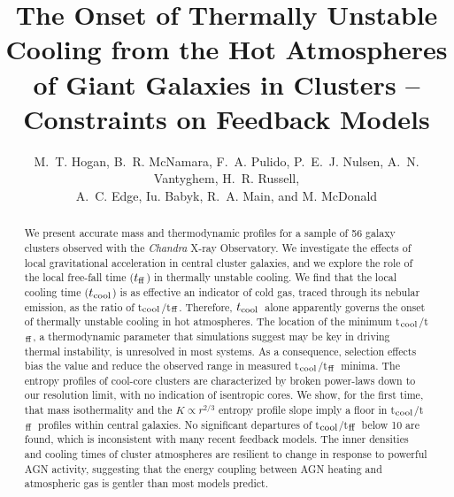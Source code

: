 \documentclass[twocolumn]{aastex6}
\newcommand{\tctff}{{t$_{\rm cool}$/t$_{\rm ff}$}}
\newcommand{\tc}{$t_{\rm cool}$}
\newcommand{\tff}{$t_{\rm ff}$}
\begin{document}
\title{The Onset of Thermally Unstable Cooling from the Hot Atmospheres of Giant Galaxies in Clusters -- Constraints on Feedback Models}

\author{M.~T. Hogan, B.~R. McNamara, F.~A. Pulido, P.~E.~J. Nulsen, A.~N. Vantyghem, H.~R. Russell, \\ A.~C. Edge, Iu. Babyk, R.~A. Main, and M. McDonald}



\begin{abstract}
We present accurate mass and thermodynamic profiles for a sample of 56 galaxy clusters observed with the {\it Chandra} X-ray Observatory. We investigate the effects of local gravitational acceleration in central cluster galaxies, and we explore the role of the local free-fall time (\tff) in thermally unstable cooling.  We find that the local cooling time (\tc) is as effective an indicator of cold gas, traced through its nebular emission, as the ratio of \tctff.   Therefore, \tc\ alone apparently governs the onset of thermally unstable cooling in hot atmospheres.  The location of the minimum \tctff, a thermodynamic parameter that simulations suggest may be key in driving thermal instability, is unresolved in most systems.  As a consequence, selection effects bias the value and reduce the observed range in measured \tctff\ minima. The entropy profiles of cool-core clusters are characterized by broken power-laws down to our resolution limit, with no indication of isentropic cores.  We show, for the first time, that mass isothermality and the $K \propto r^{2/3}$ entropy profile slope imply a floor in \tctff\ profiles within central galaxies.  No significant departures of \tctff\ below 10 are found, which is inconsistent with many recent feedback models.  The inner densities and cooling times of cluster atmospheres are resilient to change in response to powerful AGN activity, suggesting that the energy coupling between AGN heating and atmospheric gas is gentler than most models predict. 
\end{abstract}
\end{document}
